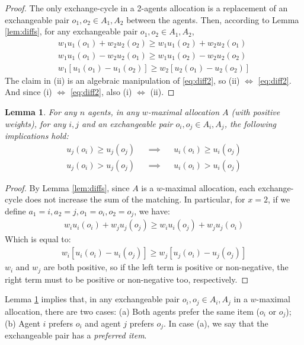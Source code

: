 \documentclass[sigconf]{aamas}
\newtheorem{lemma}[theorem]{Lemma}
\theoremstyle{definition}
\begin{document}
\begin{proof}
The only exchange-cycle in a 2-agents allocation is a replacement of an exchangeable pair $o_1,o_2 \in A_1,A_2$ between the agents.
Then, according to Lemma \ref{lem:diffs}, for any exchangeable pair $o_1, o_2\in A_1,A_2$,
\begin{align}
\label{eq:diff0}
w_1 u_1(o_1) + w_2 u_2 (o_2)
\geq
w_1 u_1(o_2) + w_2 u_2 (o_1)
\\
\label{eq:diff1}
w_1 u_1(o_1) - w_2 u_2 (o_1)
\geq
w_1 u_1(o_2) - w_2 u_2 (o_2)
\\
\label{eq:diff2}
w_1 [u_1(o_1)-u_1(o_2)]
\geq 
w_2 [u_2(o_1)-u_2(o_2)]
\end{align}
The claim in (ii) is an algebraic manipulation of \eqref{eq:diff2}, so (ii) $\iff$ \eqref{eq:diff2}. And since (i) $\iff$ \eqref{eq:diff2}, also (i) $\iff$ (ii).
\end{proof}

\begin{lemma}
\label{cases-lemma}
For any $n$ agents,
in any $w$-maximal allocation $A$ (with positive weights), for any $i,j$ and an exchangeable pair $o_i, o_j\in A_i, A_j$, the following implications hold:
\begin{align*}
u_j(o_i) \geq u_j(o_j)
&& \implies && 
u_i(o_i) \geq u_i(o_j)
\\
u_j(o_i) > u_j(o_j)
&& \implies && 
u_i(o_i) > u_i(o_j)
\end{align*}
\end{lemma}

\begin{proof}
By Lemma \ref{lem:diffs}, since $A$ is a $w$-maximal allocation, each exchange-cycle does not increase the sum of the matching. In particular, for $x=2$, if we define $a_1=i, a_2=j, o_1=o_i, o_2=o_j$, we have: 
\begin{align*}
    w_i u_i (o_i) + w_j u_j (o_j)
    \geq 
    w_i u_i (o_j) + w_j u_j (o_i)
\end{align*}
Which is equal to: 
\begin{align*}
    w_i [u_i (o_i) - u_i (o_j)]
    \geq 
    w_j [u_j (o_i) - u_j (o_j)]
\end{align*}
$w_i$ and $w_j$ are both positive, so if the left term is positive or non-negative, the right term must to be positive or non-negative too, respectively.  
\end{proof}

Lemma \ref{cases-lemma} implies that, in any exchangeable pair $o_i,o_j \in A_i, A_j$ in a $w$-maximal allocation, there are two cases:
(a) Both agents prefer the same item ($o_i$ or $o_j$);
(b) Agent $i$ prefers $o_i$ and agent $j$ prefers $o_j$.
In case (a), we say that the exchangeable pair has a \emph{preferred item}.
\end{document}
